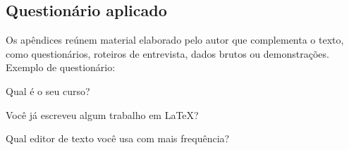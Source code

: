 \begin{apendicesenv}
	\partapendices

	\chapter{Questionário aplicado}\label{apendice:questionario}

	Os apêndices reúnem material elaborado pelo autor que complementa o texto, como questionários, roteiros de entrevista, dados brutos ou demonstrações. Exemplo de questionário:

	\begin{alineas}
		\item Qual é o seu curso?
		\item Você já escreveu algum trabalho em \LaTeX?
		\item Qual editor de texto você usa com mais frequência?
	\end{alineas}
\end{apendicesenv}
